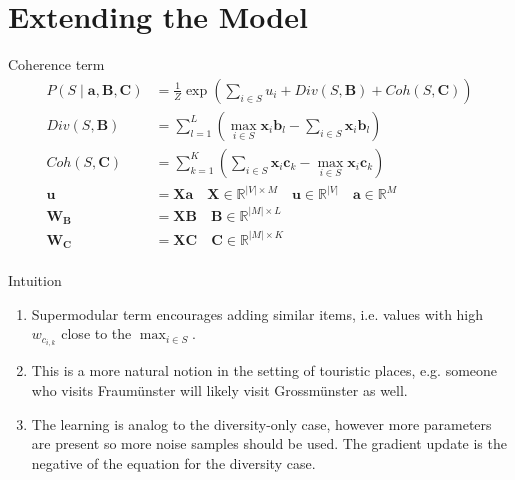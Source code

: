 \documentclass{beamer}
\begin{document}
\section{Extending the Model}

\begin{frame}{Coherence term}
  \begin{align}
    P(S \mid \bm{a}, \bm{B}, \bm{C}) &= \frac{1}{Z} \exp{\left(\sum_{i \in S}{u_{i}} + Div(S,\bm{B}) + Coh(S,\bm{C})\right)} \\
    Div(S,\bm{B}) &= \sum_{l = 1}^{L}{\left( \max_{i \in S}{\bm{x}_{i}\bm{b}_{l}} - \sum_{i \in S}{\bm{x}_{i}\bm{b}_{l}}\right)} \\
    Coh(S,\bm{C}) &= \sum_{k = 1}^{K}{\left(\sum_{i \in S}{\bm{x}_{i}\bm{c}_{k}} - \max_{i \in S}{\bm{x}_{i}\bm{c}_{k}}\right)} \\
    \bm{u} &= \bm{X}\bm{a} \quad \bm{X} \in \mathbb{R}^{|V| \times M} \quad \bm{u} \in \mathbb{R}^{|V|} \quad \bm{a} \in \mathbb{R}^{M}\\
    \bm{W}_{\bm{B}} &= \bm{X}\bm{B} \quad \bm{B} \in \mathbb{R}^{|M| \times L} \\
    \bm{W}_{\bm{C}} &= \bm{X}\bm{C} \quad \bm{C} \in \mathbb{R}^{|M| \times K} \\
  \end{align}
\end{frame}

\begin{frame}{Intuition}
  \begin{enumerate}
    \item Supermodular term encourages adding similar items, i.e. values with high $w_{c_{i,k}}$ close to the $\max_{i \in S}$.
    \item This is a more natural notion in the setting of touristic places, e.g. someone who visits Fraumünster will likely visit Grossmünster as well.
    \item The learning is analog to the diversity-only case, however more parameters are present so more noise samples should be used. The gradient update is the negative of the equation for the diversity case.
  \end{enumerate}
\end{frame}
\end{document}
